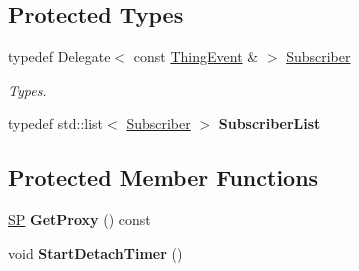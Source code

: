 \subsection*{Protected Types}
\begin{DoxyCompactItemize}
\item 
\mbox{\label{class_i_thing_adc1c62dbb379402740b35c4685efdee1}} 
typedef Delegate$<$ const \hyperlink{class_thing_event}{Thing\+Event} \& $>$ \hyperlink{class_i_thing_adc1c62dbb379402740b35c4685efdee1}{Subscriber}
\begin{DoxyCompactList}\small\item\em Types. \end{DoxyCompactList}\item 
\mbox{\label{class_i_thing_a21f4f35d7f53437297401894241e2be5}} 
typedef std\+::list$<$ \hyperlink{class_i_thing_adc1c62dbb379402740b35c4685efdee1}{Subscriber} $>$ {\bfseries Subscriber\+List}
\end{DoxyCompactItemize}
\subsection*{Protected Member Functions}
\begin{DoxyCompactItemize}
\item 
\mbox{\label{class_i_thing_a7b78d4e976ac7d55255ed2cbcf70e1e4}} 
\hyperlink{class_i_thing_a6e95654aef6362c48b9a2fd44a1f970a}{SP} {\bfseries Get\+Proxy} () const
\item 
\mbox{\label{class_i_thing_a40ca0ff681596515ef267792537ca606}} 
void {\bfseries Start\+Detach\+Timer} ()
\end{DoxyCompactItemize}
